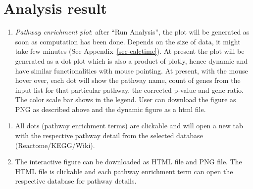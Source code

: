 \documentclass[
  a4paper,
  oneside,
  open=any]{scrreport}
\providecommand{\tightlist}{%
  \setlength{\itemsep}{0pt}\setlength{\parskip}{0pt}}\usepackage{longtable,booktabs,array}
\begin{document}
\hypertarget{analysis-result-4}{%
\section{Analysis result}\label{analysis-result-4}}

\begin{enumerate}
\def\labelenumi{\arabic{enumi}.}
\tightlist
\item
  \emph{Pathway enrichment plot}: after ``Run Analysis'', the plot will
  be generated as soon as computation has been done. Depends on the size
  of data, it might take few minutes (See Appendix~\ref{sec-calctime}).
  At present the plot will be generated as a dot plot which is also a
  product of plotly, hence dynamic and have similar functionalities with
  mouse pointing. At present, with the mouse hover over, each dot will
  show the pathway name, count of genes from the input list for that
  particular pathway, the corrected p-value and gene ratio. The color
  scale bar shows in the legend. User can download the figure as PNG as
  described above and the dynamic figure as a html file.\\
\end{enumerate}

\begin{tcolorbox}[enhanced jigsaw, title=\textcolor{quarto-callout-note-color}{\faInfo}\hspace{0.5em}{Note}, rightrule=.15mm, coltitle=black, colback=white, opacitybacktitle=0.6, colframe=quarto-callout-note-color-frame, colbacktitle=quarto-callout-note-color!10!white, opacityback=0, leftrule=.75mm, bottomtitle=1mm, toptitle=1mm, breakable, left=2mm, titlerule=0mm, arc=.35mm, toprule=.15mm, bottomrule=.15mm]

\begin{enumerate}
\def\labelenumi{\arabic{enumi}.}
\tightlist
\item
  All dots (pathway enrichment terms) are clickable and will open a new
  tab with the respective pathway detail from the selected database
  (Reactome/KEGG/Wiki).
\item
  The interactive figure can be downloaded as HTML file and PNG file.
  The HTML file is clickable and each pathway enrichment term can open
  the respective database for pathway details.
\end{enumerate}

\end{tcolorbox}
\end{document}
